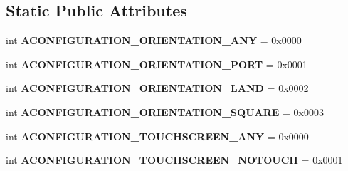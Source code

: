\subsection*{Static Public Attributes}
\begin{DoxyCompactItemize}
\item 
\mbox{\label{classarsc_1_1external_1_1configuration_1_1AConfiguration_a06cf64f40e366782bc7d2fb1e10ddc76}} 
int {\bfseries A\+C\+O\+N\+F\+I\+G\+U\+R\+A\+T\+I\+O\+N\+\_\+\+O\+R\+I\+E\+N\+T\+A\+T\+I\+O\+N\+\_\+\+A\+NY} = 0x0000
\item 
\mbox{\label{classarsc_1_1external_1_1configuration_1_1AConfiguration_aee51ab8c375d82efa91b06510c4f39bb}} 
int {\bfseries A\+C\+O\+N\+F\+I\+G\+U\+R\+A\+T\+I\+O\+N\+\_\+\+O\+R\+I\+E\+N\+T\+A\+T\+I\+O\+N\+\_\+\+P\+O\+RT} = 0x0001
\item 
\mbox{\label{classarsc_1_1external_1_1configuration_1_1AConfiguration_a211d6f8110776575fb805e28025226cc}} 
int {\bfseries A\+C\+O\+N\+F\+I\+G\+U\+R\+A\+T\+I\+O\+N\+\_\+\+O\+R\+I\+E\+N\+T\+A\+T\+I\+O\+N\+\_\+\+L\+A\+ND} = 0x0002
\item 
\mbox{\label{classarsc_1_1external_1_1configuration_1_1AConfiguration_abaa3441f7795510f00339f19c89e0628}} 
int {\bfseries A\+C\+O\+N\+F\+I\+G\+U\+R\+A\+T\+I\+O\+N\+\_\+\+O\+R\+I\+E\+N\+T\+A\+T\+I\+O\+N\+\_\+\+S\+Q\+U\+A\+RE} = 0x0003
\item 
\mbox{\label{classarsc_1_1external_1_1configuration_1_1AConfiguration_a040337807465fa6565970fcc3cfff351}} 
int {\bfseries A\+C\+O\+N\+F\+I\+G\+U\+R\+A\+T\+I\+O\+N\+\_\+\+T\+O\+U\+C\+H\+S\+C\+R\+E\+E\+N\+\_\+\+A\+NY} = 0x0000
\item 
\mbox{\label{classarsc_1_1external_1_1configuration_1_1AConfiguration_a352cf08b07ddb3d6d2c1031eb3439ca2}} 
int {\bfseries A\+C\+O\+N\+F\+I\+G\+U\+R\+A\+T\+I\+O\+N\+\_\+\+T\+O\+U\+C\+H\+S\+C\+R\+E\+E\+N\+\_\+\+N\+O\+T\+O\+U\+CH} = 0x0001
\item 
\mbox{\label{classarsc_1_1external_1_1configuration_1_1AConfiguration_ab784ce4d21e17e5a2414877096336990}} 

\end{DoxyCompactItemize}
